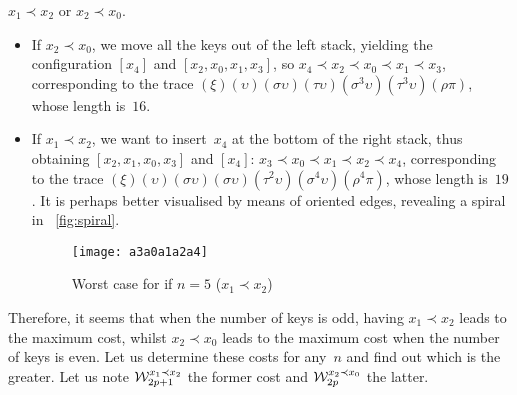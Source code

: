 \(x_1 \prec x_2\) or \(x_2 \prec x_0\).
\begin{itemize}

\item If \(x_2 \prec x_0\), we move all the keys out of the left
  stack, yielding the configuration \([x_4]\) and \([x_2, x_0, x_1,
  x_3]\), so \(x_4 \prec x_2 \prec x_0 \prec x_1 \prec x_3\),
  corresponding to the trace
  \((\xi)(\upsilon)(\sigma\upsilon)(\tau\upsilon)(\sigma^3\upsilon)
  (\tau^3\upsilon)(\rho\pi)\), whose length is~\(16\).

\item If \(x_1 \prec x_2\), we want to insert~\(x_4\) at the bottom of
  the right stack, thus obtaining \([x_2, x_1, x_0, x_3]\) and
  \([x_4]\): \(x_3 \prec x_0 \prec x_1 \prec x_2 \prec x_4\),
  corresponding to the trace \((\xi)(\upsilon)
  (\sigma\upsilon)(\sigma\upsilon)(\tau^2\upsilon)(\sigma^4\upsilon)
  (\rho^4\pi)\), whose length is~\(19\). It is perhaps better
  visualised by means of oriented edges, revealing a spiral in
  \fig~\vref{fig:spiral}.
    \begin{figure}
      \centering
      \texttt{[image: a3a0a1a2a4]}
      \caption{Worst case for  if \(n=5\) (\(x_1 \prec x_2\))
               \label{fig:spiral}}
    \end{figure}

\end{itemize}
Therefore, it seems that when the number of keys is odd, having \(x_1
\prec x_2\) leads to the maximum cost, whilst \(x_2 \prec x_0\) leads
to the maximum cost when the number of keys is even. Let us determine
these costs for any~\(n\) and find out which is the greater. Let us
note \(\W{x_1 \prec x_2}{2p+1}\) the former cost and \(\W{x_2 \prec
  x_0}{2p}\) the latter.
